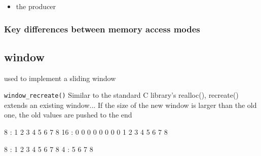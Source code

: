 \begin{itemize}
\item the producer 
\end{itemize}



\subsubsection{Key differences between memory access modes}

\subsection{window}
used to implement a sliding window

{\tt window\_recreate()}
Similar to the standard C library's realloc(), recreate() extends an existing
window...
If the size of the new window is larger than the old one, the old values are
pushed to the end

8   : 1 2 3 4 5 6 7 8
16  : 0 0 0 0 0 0 0 0 1 2 3 4 5 6 7 8

8   : 1 2 3 4 5 6 7 8
4   : 5 6 7 8
